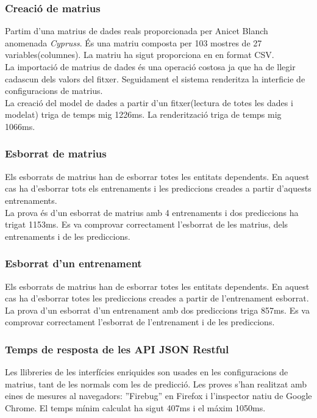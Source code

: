 \subsubsection{Creaci\'{o} de matrius}
\label{cypruss}
Partim d'una matrius de dades reals proporcionada per Anicet Blanch anomenada \textit{Cypruss}. \'{E}s una matriu composta per 103 mostres de 27 variables(columnes). La matriu ha sigut proporciona en en format CSV.\\

La importaci\'{o} de matrius de dades \'{e}s una operaci\'{o} costosa ja que ha de llegir cadascun dels valors del fitxer. Seguidament el sistema renderitza la interficie de configuracions de matrius.\\

La creaci\'{o} del model de dades a partir d'un fitxer(lectura de totes les dades i modelat) triga de temps mig 1226ms. La renderitzaci\'{o} triga de temps mig 1066ms. 

\subsubsection{Esborrat de matrius}
Els esborrats de matrius han de esborrar totes les entitats dependents. En aquest cas ha d'esborrar tots els entrenaments i les prediccions creades a partir d'aquests entrenaments.\\

La prova \'{e}s d'un esborrat de matrius amb 4 entrenaments i dos prediccions ha trigat 1153ms. Es va comprovar correctament l'esborrat de les matrius, dels entrenaments i de les prediccions.

\subsubsection{Esborrat d'un entrenament}
Els esborrats de matrius han de esborrar totes les entitats dependents. En aquest cas ha d'esborrar totes les prediccions creades a partir de l'entrenament esborrat.\\

La prova d'un esborrat d'un entrenament amb dos prediccions triga 857ms. Es va comprovar correctament l'esborrat de l'entrenament i de les prediccions.

\subsubsection{Temps de resposta de les API JSON Restful}
Les llibreries de les interfícies enriquides son usades en les configuracions de matrius, tant de les normals com les de predicci\'{o}. Les proves s'han realitzat amb eines de mesures al navegadors: ''Firebug'' en Firefox i l'inspector natiu de Google Chrome. El temps m\'{i}nim calculat ha sigut 407ms i el m\'{a}xim 1050ms.\\

